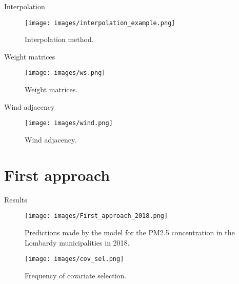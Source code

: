 \documentclass[10pt]{beamer}
\begin{document}
\begin{frame}{Interpolation}
    \begin{figure}
        \texttt{[image: images/interpolation\_example.png]}
        \caption{Interpolation method.}
    \end{figure}
\end{frame}

\begin{frame}{Weight matrices}
    \begin{figure}
        \texttt{[image: images/ws.png]}
        \caption{Weight matrices.}
    \end{figure}
\end{frame}

\begin{frame}{Wind adjacency}
    \begin{figure}
        \texttt{[image: images/wind.png]}
        \caption{Wind adjacency.}
    \end{figure}
\end{frame}

\section{First approach}

\begin{frame}{Results}
    \begin{figure}
        \begin{minipage}{0.45\textwidth}
            \texttt{[image: images/First\_approach\_2018.png]}
            \caption{Predictions made by the model for the PM2.5 concentration in the Lombardy municipalities in 2018.}
        \end{minipage}
        \hfill
        \begin{minipage}{0.45\textwidth}
            \texttt{[image: images/cov\_sel.png]}
            \caption{Frequency of covariate selection.}
        \end{minipage}
    \end{figure}
\end{frame}
\end{document}
